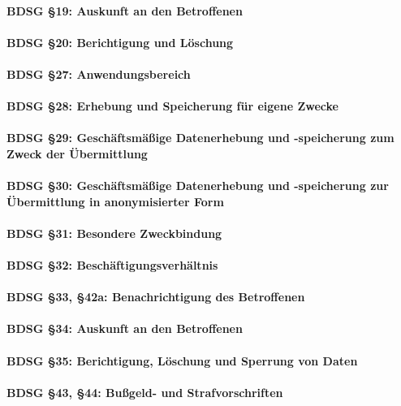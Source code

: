 \paragraph{BDSG §19: Auskunft an den Betroffenen}
\paragraph{BDSG §20: Berichtigung und Löschung}
\paragraph{BDSG §27: Anwendungsbereich}
\paragraph{BDSG §28: Erhebung und Speicherung für eigene Zwecke}
\paragraph{BDSG §29: Geschäftsmäßige Datenerhebung und -speicherung zum Zweck der Übermittlung}
\paragraph{BDSG §30: Geschäftsmäßige Datenerhebung und -speicherung zur Übermittlung in anonymisierter Form}
\paragraph{BDSG §31: Besondere Zweckbindung}
\paragraph{BDSG §32: Beschäftigungsverhältnis}
\paragraph{BDSG §33, §42a: Benachrichtigung des Betroffenen}
\paragraph{BDSG §34: Auskunft an den Betroffenen}
\paragraph{BDSG §35: Berichtigung, Löschung und Sperrung von Daten}
\paragraph{BDSG §43, §44: Bußgeld- und Strafvorschriften}
%
%
%
